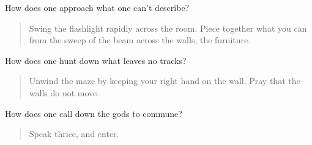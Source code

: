 How does one approach what one can't describe?

\begin{quote}
Swing the flashlight rapidly across the room. Piece together what you can from the sweep of the beam across the walls, the furniture.
\end{quote}

How does one hunt down what leaves no tracks?

\begin{quote}
Unwind the maze by keeping your right hand on the wall. Pray that the walls do not move.
\end{quote}

How does one call down the gods to commune?

\begin{quote}
Speak thrice, and enter.
\end{quote}
